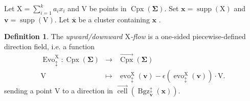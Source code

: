 \documentclass[11pt,reqno]{amsart}
\theoremstyle{plain}
\theoremstyle{definition}
\newtheorem{definition}[theorem]{Definition}
\numberwithin{equation}{section}
\newcommand\<{\langle}
\renewcommand\>{\rangle}
\newcommand{\on}[1]{\operatorname{#1}}
\def\CCx{\on{Cpx}}   %
\def\cc{\on{cell}}  %
\def\dcc{\overrightarrow{\on{cell}}}
\def\Star{\on{Star}}    %
\def\vv{\mathbf{v}}
\def\sink{X}
\newcommand{\flowd}[1]{\on{evo}^{#1}_{\downarrow}}
\newcommand{\flowu}[1]{\on{evo}^{#1}_{\uparrow}}
\newcommand{\flowdu}[1]{\on{evo}_{\updownarrow}^{#1}}
\newcommand{\flowDU}[1]{\on{Evo}_{\updownarrow}^{#1}}
\newcommand{\ccpt}[1]{\mathrm{#1}}%
\def\xevo{\ccpt{X}}%
\def\seeds{\mathbf{\Sigma}}
\def\xx{\mathbf{x}}%
\def\coex{a}
\newcommand{\commd}[2]{\on{rad}_\downarrow^{#1}(#2)}
\newcommand{\commu}[2]{\on{rad}_\uparrow^{#1}(#2)}
\newcommand{\commdu}[2]{\on{rad}_\updownarrow^{#1}(#2)}
\def\supp{\on{supp}}
\newcommand{\Bgzpm}[2]{\operatorname{Bgz}^{\updownarrow}_{#2}(#1)}
\newcommand{\ol}[1]{\overline{#1}}
\newcommand{\DT}[1]{#1^{\vee}}
\def\dCpx{\overrightarrow{\CCx}}
\def\csum{\epsilon}
\begin{document}
Let $\xevo=\sum_{i=1}^k \coex_i x_i$ and $\ccpt{V}$ be points in $\CCx(\seeds)$.
Set $\xx=\supp(\xevo)$ and $\vv=\supp(\ccpt{V})$.
Let $\ol{\xx}$ be a cluster containing $\xx$ .



\begin{definition}\label{def:Evo}
The \emph{upward/downward $\xevo$-\EVO flow} is a one-sided piecewise-defined direction field, i.e. a function
\begin{equation}\label{eq:UDflow}
\begin{array}{rcl}
\flowDU{\xevo}:\CCx(\seeds) &\to     &\dCpx(\seeds)  \\
\ccpt{V}                    &\mapsto &\flowdu{\xevo}(\vv)-\csum(\flowdu{\xevo}(\vv))\cdot\ccpt{V}.
\end{array}
\end{equation}
sending a point $\ccpt{V}$ to a direction in $\dcc(\Bgzpm{{\xx}}{\vv})$.
\end{definition}
\end{document}
